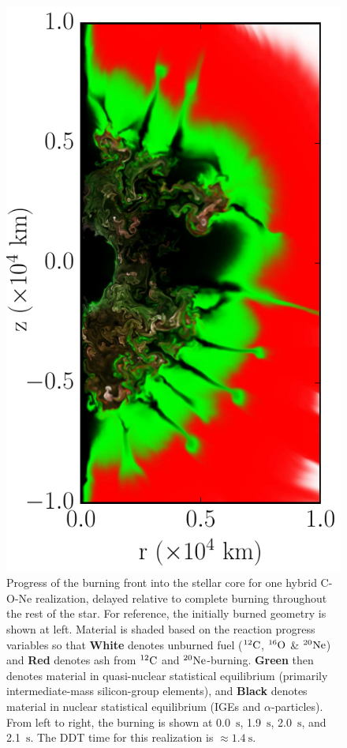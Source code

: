 \documentclass[iop,apj]{emulateapj}
\newcommand{\C}[1]{\ensuremath{{}^{#1}{\rm C}}}
\newcommand{\Ox}[1]{\ensuremath{{}^{#1}{\rm O}}}
\newcommand{\Ne}[1]{\ensuremath{{}^{#1}{\rm Ne}}}
\newcommand{\unitstyle}[1]{\ensuremath{\mathrm{#1}}}
\newcommand{\second}{\unitstyle{s}}
\begin{document}
\begin{figure}[!ht]
\begin{minipage}{0.24\textwidth}
    \includegraphics[width=\linewidth]{"figures/samples/cone_400k_m16_a12_0210"}
  \end{minipage} \caption{\label{fig:cone_delayed_core} Progress of the burning front into the stellar core for one hybrid C-O-Ne realization, delayed relative to complete burning throughout the rest of the star. For reference, the initially burned geometry is shown at left. Material is shaded based on the reaction progress variables so that \textbf{White} denotes unburned fuel (\C{12}, \Ox{16} \& \Ne{20}) and \textbf{Red} denotes ash from \C{12} and \Ne{20}-burning. \textbf{Green} then denotes material in quasi-nuclear statistical equilibrium (primarily intermediate-mass silicon-group elements), and \textbf{Black} denotes material in nuclear statistical equilibrium (IGEs and $\alpha$-particles). From left to right, the burning is shown at 0.0~\second, 1.9~\second, 2.0~\second, and 2.1~\second. The DDT time for this realization is $\approx \mathrm{1.4}~\second$.}
\end{figure}
\end{document}
